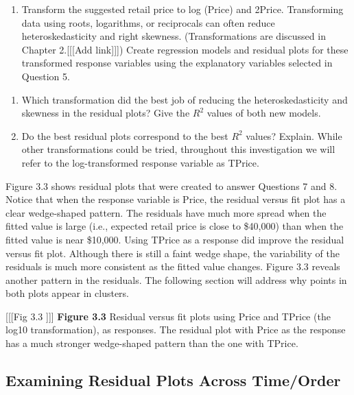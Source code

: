 \documentclass[
]{report}
\providecommand{\tightlist}{%
  \setlength{\itemsep}{0pt}\setlength{\parskip}{0pt}}
\begin{document}
\begin{enumerate}
\def\labelenumi{\arabic{enumi}.}
\setcounter{enumi}{7}
\tightlist
\item
  Transform the suggested retail price to log (Price) and 2Price. Transforming data using roots, logarithms, or reciprocals can often reduce heteroskedasticity and right skewness. (Transformations are discussed in Chapter 2.{[}{[}{[}Add link{]}{]}{]}) Create regression models and residual plots for these transformed response variables using the
  explanatory variables selected in Question 5.
\end{enumerate}

\begin{enumerate}
\def\labelenumi{\alph{enumi}.}
\item
  Which transformation did the best job of reducing the heteroskedasticity and skewness in the residual plots? Give the \(R^2\) values of both new models.
\item
  Do the best residual plots correspond to the best \(R^2\) values? Explain.
  While other transformations could be tried, throughout this investigation we will refer to the log-transformed response variable as TPrice.
\end{enumerate}

Figure 3.3 shows residual plots that were created to answer Questions 7 and 8. Notice that when the response variable is Price, the residual versus fit plot has a clear wedge-shaped pattern. The residuals have much more spread when the fitted value is large (i.e., expected retail price is close to \$40,000) than when the fitted value is near \$10,000. Using TPrice as a response did improve the residual versus fit plot. Although
there is still a faint wedge shape, the variability of the residuals is much more consistent as the fitted value changes. Figure 3.3 reveals another pattern in the residuals. The following section will address why points in both plots appear in clusters.

{[}{[}{[}Fig 3.3 {]}{]}{]}
\textbf{Figure 3.3} Residual versus fit plots using Price and TPrice (the log10 transformation), as responses. The residual plot with Price as the response has a much stronger wedge-shaped pattern than the one with TPrice.

\subsection*{Examining Residual Plots Across Time/Order}\label{examining-residual-plots-across-timeorder}
\end{document}
